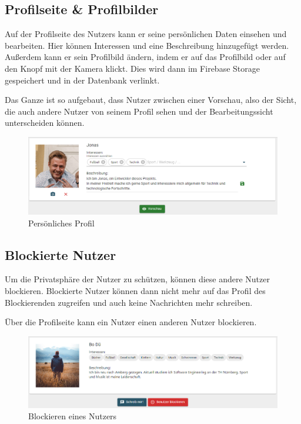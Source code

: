 \subsection{Profilseite \& Profilbilder}
\label{sec:profilepictures}

Auf der Profilseite des Nutzers kann er seine persönlichen Daten einsehen und bearbeiten. Hier können Interessen und eine Beschreibung hinzugefügt werden.
Außerdem kann er sein Profilbild ändern, indem er auf das Profilbild oder auf den Knopf mit der Kamera klickt.
Dies wird dann im Firebase Storage gespeichert und in der Datenbank verlinkt.

Das Ganze ist so aufgebaut, dass Nutzer zwischen einer Vorschau, also der Sicht, die auch andere Nutzer von seinem Profil sehen und der Bearbeitungssicht unterscheiden können.

\begin{figure}[ht!]
    \begin{centering}
        \includegraphics[width=1\textwidth]{figures/implementation/my-profile-header.png}
        \caption{Persönliches Profil}
        \label{fig:myProfileHeader}
    \end{centering}
\end{figure}

\subsection{Blockierte Nutzer}
\label{sec:blockedusers}

Um die Privatsphäre der Nutzer zu schützen, können diese andere Nutzer blockieren.
Blockierte Nutzer können dann nicht mehr auf das Profil des Blockierenden zugreifen und auch keine Nachrichten mehr schreiben.

Über die Profilseite kann ein Nutzer einen anderen Nutzer blockieren.

\begin{figure}[ht!]
    \begin{centering}
        \includegraphics[width=1\textwidth]{figures/implementation/profile-header.png}
        \caption{Blockieren eines Nutzers}
        \label{fig:blockUser}
    \end{centering}
\end{figure}

